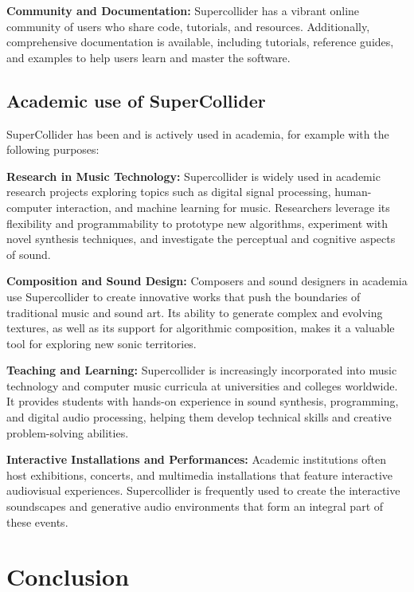 \documentclass[a4paper]{book}
\begin{document}
\textbf{Community and Documentation:} Supercollider has a vibrant online community of users who share code, tutorials, and resources. Additionally, comprehensive documentation is available, including tutorials, reference guides, and examples to help users learn and master the software.

\section*{Academic use of SuperCollider}
SuperCollider has been and is actively used in academia, for example with the following purposes:

\textbf{Research in Music Technology:} Supercollider is widely used in academic research projects exploring topics such as digital signal processing, human-computer interaction, and machine learning for music. Researchers leverage its flexibility and programmability to prototype new algorithms, experiment with novel synthesis techniques, and investigate the perceptual and cognitive aspects of sound.

\textbf{Composition and Sound Design:} Composers and sound designers in academia use Supercollider to create innovative works that push the boundaries of traditional music and sound art. Its ability to generate complex and evolving textures, as well as its support for algorithmic composition, makes it a valuable tool for exploring new sonic territories.

\textbf{Teaching and Learning:} Supercollider is increasingly incorporated into music technology and computer music curricula at universities and colleges worldwide. It provides students with hands-on experience in sound synthesis, programming, and digital audio processing, helping them develop technical skills and creative problem-solving abilities.

\textbf{Interactive Installations and Performances:} Academic institutions often host exhibitions, concerts, and multimedia installations that feature interactive audiovisual experiences. Supercollider is frequently used to create the interactive soundscapes and generative audio environments that form an integral part of these events.

\backmatter
\chapter{Conclusion}


\printbibliography
\end{document}
